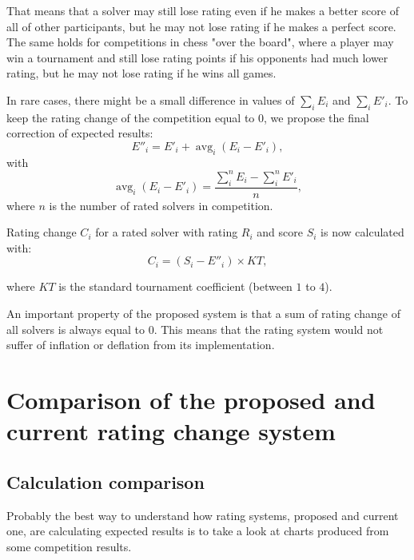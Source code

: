 \documentclass[preprint,12pt]{article}
\DeclareMathOperator{\avg}{avg}
\begin{document}
That means that a solver may still lose rating even if he
makes a better score of all of other participants, but he may not lose
rating if he makes a perfect score.
The same holds for competitions in chess "over the board", where
a player may win a tournament and still lose rating points
if his opponents had much lower rating,
but he may not lose rating if he wins all games.

In rare cases, there might be a small difference in values of
$\sum_i E_i$ and $\sum_i E'_i$.
To keep the rating change of the competition equal to $0$,
we propose the final correction of expected results:
\begin{equation}
E''_i = E'_i + \avg_i(E_i-E'_i),
\end{equation}
with
\begin{equation}
\avg_i(E_i-E'_i) = \frac{\sum_i^n E_i - \sum_i^n E'_i}{n},
\end{equation}
where $n$ is the number of rated solvers in competition.

Rating change $C_i$ for a rated solver with rating $R_i$ and score $S_i$ 
is now calculated with:
\begin{equation}
C_i = (S_i - E''_i)\times KT,
\end{equation}

where $KT$ is the standard tournament coefficient (between $1$ to $4$).

An important property of the proposed system is that
a sum of rating change of all solvers is always equal to $0$.
This means that the rating system would not suffer of inflation or deflation
from its implementation.

\section{Comparison of the proposed and current rating change system}

\subsection{Calculation comparison}

Probably the best way to understand how rating systems, proposed and current one,
are calculating expected results is to take a look at charts
produced from some competition results.
\end{document}
